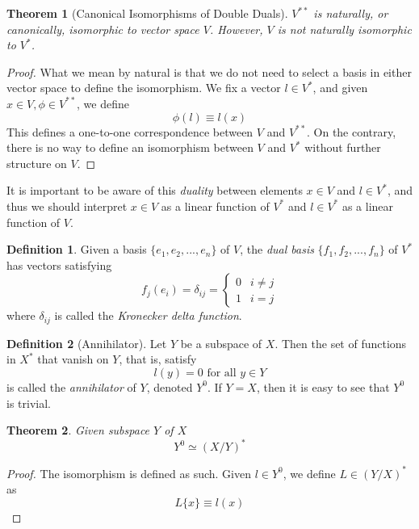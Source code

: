 \documentclass{article}
\newtheorem{theorem}{Theorem}[section]
\theoremstyle{remark}
\theoremstyle{definition}
\newtheorem{definition}{Definition}[section]
\begin{document}
    \begin{theorem}[Canonical Isomorphisms of Double Duals]
    $V^{**}$ is \textit{naturally, or canonically, isomorphic} to vector space $V$. However, $V$ is not naturally isomorphic to $V^*$. 
    \end{theorem}

    \begin{proof}
    What we mean by natural is that we do not need to select a basis in either vector space to define the isomorphism. We fix a vector $l \in V^*$, and given $x \in V, \phi \in V^{**}$, we define
    \[ \phi(l) \equiv l(x) \]
    This defines a one-to-one correspondence between $V$ and $V^{**}$. On the contrary, there is no way to define an isomorphism between $V$ and $V^*$ without further structure on $V$. 
    \end{proof}

    It is important to be aware of this \textit{duality} between elements $x \in V$ and $l \in V^*$, and thus we should interpret $x \in V$ as a linear function of $V^*$ and $l \in V^*$ as a linear function of $V$.

    \begin{definition}
    Given a basis $\{ e_1, e_2, ..., e_n\}$ of $V$, the \textit{dual basis} $\{f_1, f_2, ..., f_n\}$ of $V^*$ has vectors satisfying 
    \[ f_j (e_i) = \delta_{i j} = 
    \begin{cases}
    0 & i \neq j \\
    1 & i = j
    \end{cases}\]
    where $\delta_{i j}$ is called the \textit{Kronecker delta function}. 
    \end{definition}

    \begin{definition}[Annihilator]
    Let $Y$ be a subspace of $X$. Then the set of functions in $X^*$ that vanish on $Y$, that is, satisfy
    \[l(y) = 0 \text{ for all } y \in Y\]
    is called the \textit{annihilator} of $Y$, denoted $Y^0$. If $Y = X$, then it is easy to see that $Y^0$ is trivial. 
    \end{definition}

    \begin{theorem} Given subspace $Y$ of $X$ 
    \[ Y^0 \simeq (X / Y)^*\]
    \end{theorem}

    \begin{proof}
    The isomorphism is defined as such. Given $l \in Y^0$, we define $L \in (Y/X)^*$ as 
    \[L\{x\} \equiv l(x)\]
    \end{proof}
\end{document}
